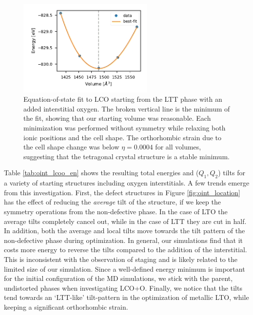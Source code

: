 \begin{figure}
	\centering
	\includegraphics[width=0.6\textwidth]{fig/md/lcoo_eos.pdf}
	\caption[LCOO EOS]{Equation-of-state fit to LCO starting from the LTT phase with an added interstitial oxygen. The broken vertical line is the minimum of the fit, showing that our starting volume was reasonable. Each minimization was performed without symmetry while relaxing both ionic positions and the cell shape. The orthorhombic strain due to the cell shape change was below $\eta = 0.0004$ for all volumes, suggesting that the tetragonal crystal structure is a stable minimum.}
	\label{fig:lcoo_eos}
\end{figure}

Table \ref{tab:oint_lcoo_en} shows the resulting total energies and ($Q_1, Q_2$) tilts for a variety of starting structures including oxygen interstitials. A few trends emerge from this investigation. First, the defect structures in Figure \ref{fig:oint_location} has the effect of reducing the \emph{average} tilt of the structure, if we keep the symmetry operations from the non-defective phase. In the case of LTO the average tilts completely cancel out, while in the case of LTT they are cut in half. In addition, both the average and local tilts move towards the tilt pattern of the non-defective phase during optimization. In general, our simulations find that it costs more energy to reverse the tilts compared to the addition of the interstitial. This is inconsistent with the observation of staging and is likely related to the limited size of our simulation. Since a well-defined energy minimum is important for the initial configuration of the MD simulations, we stick with the parent, undistorted phases when investigating LCO+O. Finally, we notice that the tilts tend towards an `LTT-like' tilt-pattern in the optimization of metallic LTO, while keeping a significant orthorhombic strain. 

